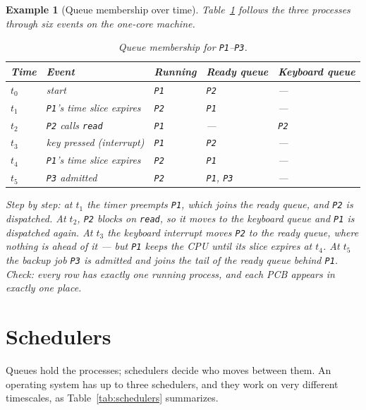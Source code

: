 \documentclass[11pt]{article}
\newtheorem{example}{Example}
\begin{document}
\begin{example}[Queue membership over time]
\label{ex:membership}
Table~\ref{tab:membership} follows the three processes through six events on
the one-core machine.

\begin{table}[h]
\centering
\small
\renewcommand{\arraystretch}{1.2}
\begin{tabular}{@{}lllll@{}}
\toprule
\textbf{Time} & \textbf{Event} & \textbf{Running} & \textbf{Ready queue} & \textbf{Keyboard queue} \\
\midrule
$t_0$ & start & \texttt{P1} & \texttt{P2} & --- \\
$t_1$ & \texttt{P1}'s time slice expires & \texttt{P2} & \texttt{P1} & --- \\
$t_2$ & \texttt{P2} calls \texttt{read} & \texttt{P1} & --- & \texttt{P2} \\
$t_3$ & key pressed (interrupt) & \texttt{P1} & \texttt{P2} & --- \\
$t_4$ & \texttt{P1}'s time slice expires & \texttt{P2} & \texttt{P1} & --- \\
$t_5$ & \texttt{P3} admitted & \texttt{P2} & \texttt{P1}, \texttt{P3} & --- \\
\bottomrule
\end{tabular}
\caption{Queue membership for \texttt{P1}--\texttt{P3}.}
\label{tab:membership}
\end{table}

Step by step: at $t_1$ the timer preempts \texttt{P1}, which joins the ready
queue, and \texttt{P2} is dispatched. At $t_2$, \texttt{P2} blocks on
\texttt{read}, so it moves to the keyboard queue and \texttt{P1} is dispatched
again. At $t_3$ the keyboard interrupt moves \texttt{P2} to the ready queue,
where nothing is ahead of it --- but \texttt{P1} keeps the CPU until its slice
expires at $t_4$. At $t_5$ the backup job \texttt{P3} is admitted and joins the
tail of the ready queue behind \texttt{P1}. \emph{Check:} every row has exactly
one running process, and each PCB appears in exactly one place.
\end{example}

\section{Schedulers}
\label{sec:schedulers}

\noindent{}

Queues hold the processes; schedulers decide who moves between them. An
operating system has up to three schedulers, and they work on very different
timescales, as Table~\ref{tab:schedulers} summarizes.
\end{document}

